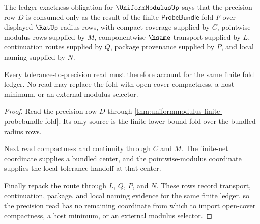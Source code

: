 \begin{theorem}
\label{thm:uniformmodulus-ledger-exactness-obligation}
The ledger exactness obligation for $\UniformModulusUp$ says that the precision row $D$ is consumed only as the result of the finite $\mathsf{ProbeBundle}$ fold $F$ over displayed $\RatUp$ radius rows, with compact coverage supplied by $C$, pointwise-modulus rows supplied by $M$, componentwise $\hsame$ transport supplied by $L$, continuation routes supplied by $Q$, package provenance supplied by $P$, and local naming supplied by $N$.

Every tolerance-to-precision read must therefore account for the same finite fold ledger. No read may replace the fold with open-cover compactness, a host minimum, or an external modulus selector.
\end{theorem}
\begin{proof}
Read the precision row $D$ through \autoref{thm:uniformmodulus-finite-probebundle-fold}. Its only source is the finite lower-bound fold over the bundled radius rows.

Next read compactness and continuity through $C$ and $M$. The finite-net coordinate supplies a bundled center, and the pointwise-modulus coordinate supplies the local tolerance handoff at that center.

Finally repack the route through $L$, $Q$, $P$, and $N$. These rows record transport, continuation, package, and local naming evidence for the same finite ledger, so the precision read has no remaining coordinate from which to import open-cover compactness, a host minimum, or an external modulus selector.
\end{proof}

